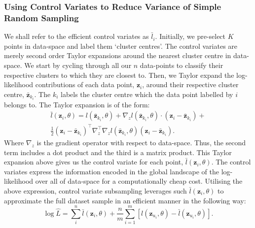 \subsubsection{Using Control Variates to Reduce Variance of Simple Random Sampling}

We shall refer to the efficient control variates as $\bar{l}_i$. Initially, we pre-select $K$ points in data-space and label them `cluster centres'. The control variates are merely second order Taylor expansions around the nearest cluster centre in data-space. We start by cycling through all our $n$ data-points to classify their respective clusters to which they are closest to. Then, we Taylor expand the log-likelihood contributions of each data point, $\textbf{z}_i$, around their respective cluster centre, $\bar{\textbf{z}}_{k_{i}}$. The $k_{i}$ labels the cluster centre which the data point labelled by $i$ belongs to. The Taylor expansion is of the form:
%
\begin{equation}
\begin{aligned}
\bar{l}(\textbf{z}_i,\theta) = l(\bar{\textbf{z}}_{k_{i}},\theta)+ \nabla_z l(\bar{\textbf{z}}_{k_{i}},\theta) \cdot (\textbf{z}_i-\bar{\textbf{z}}_{k_{i}})+ \\ 
\frac{1}{2}(\textbf{z}_i-\bar{\textbf{z}}_{k_{i}})^\intercal  \nabla_z^\intercal \nabla_z l(\bar{\textbf{z}}_{k_{i}},\theta)(\textbf{z}_i-\bar{\textbf{z}}_{k_{i}}).
\end{aligned}
\label{eq:taylor}
\end{equation}
%
Where $\nabla_z$ is the gradient operator with respect to data-space. Thus, the second term includes a dot product and the third is a matrix product. This Taylor expansion above gives us the control variate for each point, $\bar{l}(\textbf{z}_i,\theta)$. The control variates express the information encoded in the global landscape of the log-likelihood over all of data-space for a computationally cheap cost. 
Utilising the above expression, control variate subsampling leverages such $\bar{l}(\textbf{z}_i,\theta)$ to approximate the full dataset sample in an efficient manner in the following way:
\begin{equation}
    \log \hat{L}= \sum_{i}^{n} \bar{l}(\textbf{z}_i,\theta) + \frac{n}{m} \sum_{i=1}^{m} \left[ l(\textbf{z}_{u_i},\theta) - \bar{l}(\textbf{z}_{u_i},\theta) \right].
\label{cvv}
\end{equation}
%
